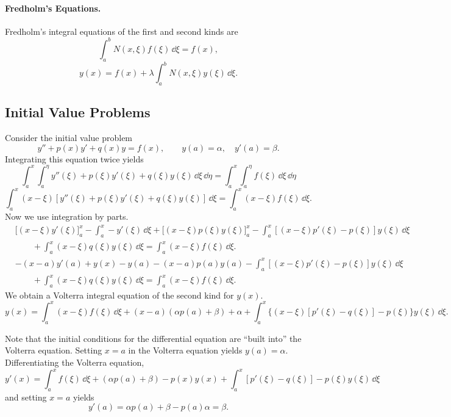 \paragraph{Fredholm's Equations.}
Fredholm's integral equations of the first and second kinds are
\[
\int_a^b N(x,\xi) f(\xi) \,\dd \xi = f(x),
\]
\[
y(x) = f(x) + \lambda \int_a^b N(x,\xi) y(\xi) \,\dd \xi.
\]




\subsection{Initial Value Problems}

Consider the initial value problem
\[
y'' + p(x) y' + q(x) y = f(x), \qquad y(a)=\alpha, \quad y'(a)=\beta.
\]
Integrating this equation twice yields
\[
\int_a^x \int_a^\eta y''(\xi) + p(\xi) y'(\xi) + q(\xi) y(\xi) \,\dd \xi \,\dd \eta
= \int_a^x \int_a^\eta f(\xi) \,\dd \xi \,\dd \eta
\]
\[
\int_a^x (x-\xi)[y''(\xi) + p(\xi) y'(\xi) + q(\xi) y(\xi)] \,\dd \xi 
= \int_a^x (x-\xi) f(\xi) \,\dd \xi .
\]
Now we use integration by parts.
\begin{align*}
  &\big[ (x-\xi) y'(\xi) \big]_a^x - \int_a^x -y'(\xi) \,\dd \xi
  +\big[ (x-\xi) p(\xi) y(\xi) \big]_a^x 
  - \int_a^x [(x-\xi)p'(\xi) - p(\xi)]y(\xi) \,\dd \xi \\
  &\qquad + \int_a^x (x-\xi) q(\xi) y(\xi) \,\dd \xi 
  = \int_a^x (x-\xi) f(\xi) \,\dd \xi .
\end{align*}
\begin{align*}
  &- (x-a) y'(a) + y(x) - y(a) -(x-a) p(a) y(a) 
  - \int_a^x [(x-\xi)p'(\xi) - p(\xi)]y(\xi) \,\dd \xi \\
  & \qquad + \int_a^x (x-\xi) q(\xi) y(\xi) \,\dd \xi 
  = \int_a^x (x-\xi) f(\xi) \,\dd \xi .
\end{align*}
We obtain a Volterra integral equation of the second kind for $y(x)$.
\[
\boxed{
  y(x) = \int_a^x (x-\xi) f(\xi) \,\dd \xi + (x-a) (\alpha p(a) +\beta) + \alpha
  + \int_a^x \big\{ (x-\xi) [p'(\xi)-q(\xi)]-p(\xi) \big\} y(\xi)\,\dd \xi .
  }
\]

Note that the initial conditions for the differential equation are ``built 
into'' the Volterra equation.  Setting $x=a$ in the Volterra equation 
yields $y(a)=\alpha$.  Differentiating the Volterra equation,
\[
y'(x) = \int_a^x f(\xi) \,\dd \xi + (\alpha p(a) + \beta) - p(x) y(x) 
+ \int_a^x [p'(\xi)-q(\xi)]-p(\xi)y(\xi) \,\dd \xi
\]
and setting $x=a$ yields
\[
y'(a) = \alpha p(a) + \beta - p(a) \alpha = \beta.
\]

